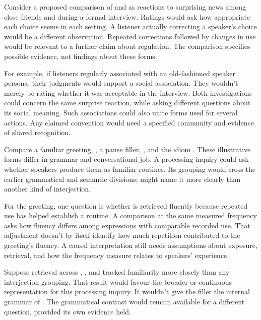 Consider a proposed comparison of  and 
as reactions to surprising news among close friends and during a
formal interview. Ratings would ask how appropriate each choice seems
in each setting. A listener actually correcting a speaker's choice
would be a different observation. Repeated corrections followed by
changes in use would be relevant to a further claim about regulation.
The comparison specifies possible evidence, not findings about these forms.

For example, if listeners regularly associated  with an
old-fashioned speaker persona, their judgments would support a social
association. They wouldn't merely be rating whether it was acceptable
in the interview. Both investigations could concern the same surprise
reaction, while asking different questions about its social meaning.
Such associations could also unite forms used for several actions.
Any claimed convention would need a specified community and evidence
of shared recognition.

Compare a familiar greeting, , a pause filler,
, and the idiom . These illustrative
forms differ in grammar and conversational job. A processing inquiry
could ask whether speakers produce them as familiar routines.
Its grouping would cross the earlier grammatical and semantic divisions;
 might name it more clearly than another
kind of interjection.

For the greeting, one question is whether  is
retrieved fluently because repeated use has helped establish a routine.
A comparison at the same measured frequency asks how fluency differs
among expressions with comparable recorded use. That adjustment doesn't
by itself identify how much repetition contributed to the greeting's
fluency. A causal interpretation still needs assumptions about exposure,
retrieval, and how the frequency measure relates to speakers' experience.

Suppose retrieval across , , and
 tracked familiarity more closely than any
interjection grouping. That result would favour the broader or continuous
representation for this processing inquiry. It wouldn't give the filler
 the internal grammar of . The
grammatical contrast would remain available for a different question,
provided its own evidence held.


